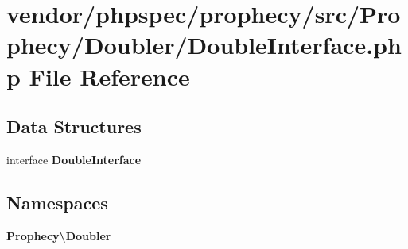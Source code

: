 \section{vendor/phpspec/prophecy/src/\+Prophecy/\+Doubler/\+Double\+Interface.php File Reference}
\label{_double_interface_8php}
\subsection*{Data Structures}
\begin{DoxyCompactItemize}
\item 
interface {\bf Double\+Interface}
\end{DoxyCompactItemize}
\subsection*{Namespaces}
\begin{DoxyCompactItemize}
\item 
 {\bf Prophecy\textbackslash{}\+Doubler}
\end{DoxyCompactItemize}
